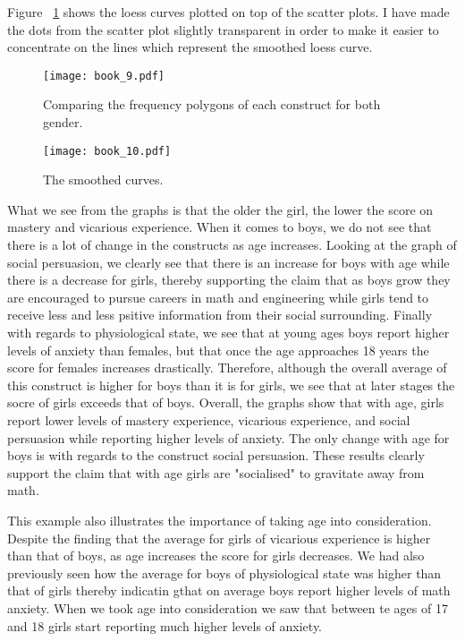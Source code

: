 \documentclass[a4paper,12pt,oneside]{book}
\begin{document}
Figure ~\ref{fig:factorscatter} shows the loess curves plotted on top of the scatter plots. I have made the dots from the scatter plot slightly
transparent in order to make it easier to concentrate on the lines which represent the smoothed loess curve. 

\begin{stlog}\end{stlog}
\begin{figure}[h]
    \centering
    \texttt{[image: book\_9.pdf]}
    \caption{Comparing the frequency polygons of each construct for both gender.}
    \label{fig:factorscatter}
\end{figure}

\begin{stlog}\end{stlog}
\begin{figure}[h]
    \centering
    \texttt{[image: book\_10.pdf]}
    \caption{The smoothed curves.}
    \label{fig:factorscatterloess}
\end{figure}

What we see from the graphs is that the older the girl, the lower the score on mastery and vicarious experience. When it comes to boys,
we do not see that there is a lot of change in the constructs as age increases. Looking at the graph of social persuasion, we clearly see that there
is an increase for boys with age while there is a decrease for girls, thereby supporting the claim that as boys grow they are encouraged to 
pursue careers in math and engineering while girls tend to receive less and less psitive information from their social surrounding. Finally
with regards to physiological state, we see that at young ages boys report higher levels of anxiety than females, but that once the age approaches
18 years the score for females increases drastically. Therefore, although the overall average of this construct is higher for boys than it is for
girls, we see that at later stages the socre of girls exceeds that of boys. Overall, the graphs show that with age, girls report lower levels of
mastery experience, vicarious experience, and social persuasion while reporting higher levels of anxiety. The only change with age for boys is with
regards to the construct social persuasion. These results clearly support the claim that with age girls are "socialised" to gravitate away from math.

This example also illustrates the importance of taking age into consideration. Despite the finding that the average for girls of vicarious
experience is higher than that of boys, as age increases the score for girls decreases. We had also previously seen how the average for boys of
physiological state was higher than that of girls thereby indicatin gthat on average boys report higher levels of math anxiety. When we took age
into consideration we saw that between te ages of 17 and 18 girls start reporting much higher levels of anxiety.
\end{document}

